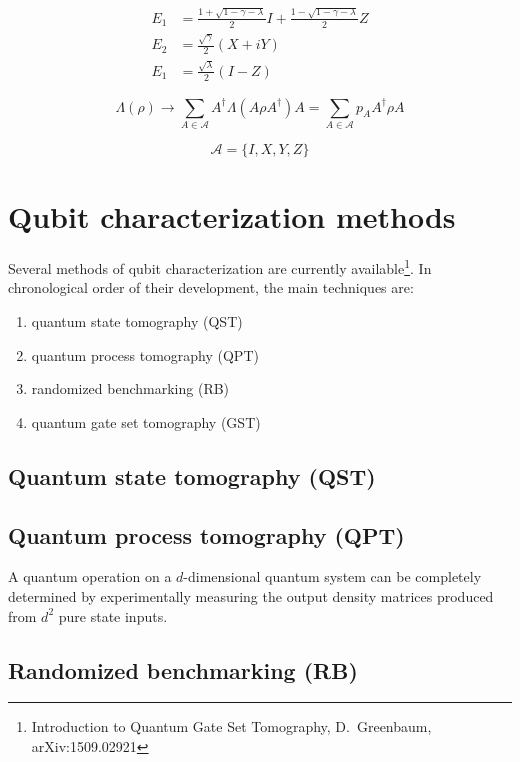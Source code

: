 \documentclass[11pt, oneside]{article}   	%
\begin{document}
\begin{align}
E_1 &= \frac{1 + \sqrt{1 - \gamma - \lambda}}{2} I + \frac{1 - \sqrt{1 - \gamma - \lambda}}{2} Z \\
E_2 &= \frac{\sqrt{\gamma}}{2} (X + iY) \\
E_1 &= \frac{\sqrt{\lambda}}{2} (I - Z)
\end{align}

\begin{equation}
\Lambda(\rho) 
\to \sum_{A \in \mathcal{A}} A^{\dagger} \Lambda(A \rho A^{\dagger}) A
= \sum_{A \in \mathcal{A}} p_A A^{\dagger} \rho A
\end{equation}

\begin{equation}
\mathcal{A} = \{ I, X, Y, Z \}
\end{equation}

\section{Qubit characterization methods}
Several methods of qubit characterization are currently available\footnote{Introduction to Quantum Gate Set Tomography, D.~Greenbaum, arXiv:1509.02921}. 
In chronological order of their development, the main techniques are:
\begin{enumerate}
\item quantum state tomography (QST)
\item quantum process tomography (QPT)
\item randomized benchmarking (RB)
\item quantum gate set tomography (GST)
\end{enumerate}

\subsection{Quantum state tomography (QST)}

\subsection{Quantum process tomography (QPT)}
A quantum operation on a $d$-dimensional quantum system can be completely determined by experimentally measuring the output density matrices produced from $d^2$ pure state inputs.

\subsection{Randomized benchmarking (RB)}
\end{document}
